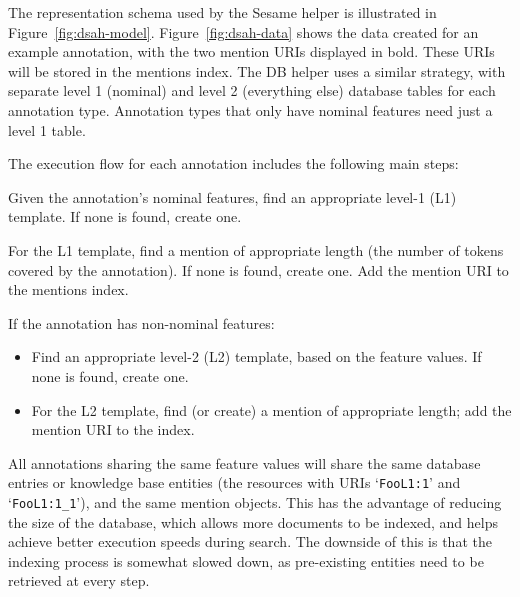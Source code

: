 The representation schema used by the Sesame helper is illustrated in
Figure~\ref{fig:dsah-model}.  Figure~\ref{fig:dsah-data} shows the data created
for an example annotation, with the two mention URIs displayed in bold. These
URIs will be stored in the mentions index.  The DB helper uses a similar
strategy, with separate level 1 (nominal) and level 2 (everything else)
database tables for each annotation type.  Annotation types that only have
nominal features need just a level 1 table.

The execution flow for each annotation includes the following main steps:
\bit
  \item Given the annotation's nominal features, find an appropriate level-1
  (L1) template. If none is found, create one.
  \item For the L1 template, find a mention of appropriate length (the number
  of tokens covered by the annotation). If none is found, create one. Add the
  mention URI to the mentions index.
  \item If the annotation has non-nominal features:
  \begin{itemize}
    \item Find an appropriate level-2 (L2) template, based on the feature
    values. If none is found, create one.
    \item For the L2 template, find (or create) a mention of appropriate length;
    add the mention URI to the index.
  \end{itemize}  
\eit

All annotations sharing the same feature values will share the same database
entries or knowledge base entities (the resources with URIs `\verb!FooL1:1!'
and `\verb!FooL1:1_1!'), and the same mention objects. This has the
advantage of reducing the size of the database, which allows more
documents to be indexed, and helps achieve better execution speeds during
search. The downside of this is that the indexing process is somewhat slowed
down, as pre-existing entities need to be retrieved at every step.
